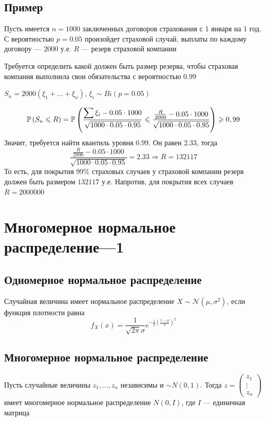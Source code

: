 \documentclass[a4paper, 10pt]{article}
\begin{document}
\subsection*{Пример}
Пусть имеется $n=1000$ заключенных договоров страхования с 1 января на 1 год. С вероятностью $p=0.05$ произойдет страховой случай, выплаты по каждому договору — 2000 у.е. $R$ — резерв страховой компании

Требуется определить какой должен быть размер резерва, чтобы страховая компания выполнила свои обязательства с вероятностью $0.99$

$S_n=2000(\xi_1+\ldots+\xi_n)$, $\xi_i\sim Bi(p=0.05)$

\begin{equation*}
    \prob{S_n\leqslant R}=\prob{\frac{\sum\xi_i-0.05\cdot1000}{\sqrt{1000\cdot0.05\cdot0.95}}\leqslant \frac{\frac{R}{2000}-0.05\cdot1000}{\sqrt{1000\cdot0.05\cdot0.95}}}\geqslant 0,99
\end{equation*}
Значит, требуется найти квантиль уровня $0.99$. Он равен $2.33$, тогда
\begin{equation*}
    \frac{\frac{R}{2000}-0.05\cdot1000}{\sqrt{1000\cdot0.05\cdot0.95}}=2.33\Longrightarrow R=132117
\end{equation*}
То есть, для покрытия 99\% страховых случаев у страховой компании резерв должен быть размером $132117$ у.е. Напротив, для покрытия всех случаев $R=2000000$




\newpage
\section{Многомерное нормальное распределение—1}
\subsection{Одномерное нормальное распределение}
 Случайная величина имеет нормальное распределение $X\sim\mathcal{N}(\mu,\sigma^2)$, если функция плотности равна
\begin{equation*}
    f_X(x)=\frac{1}{\sqrt{2\pi}\sigma}e^{-\frac{1}{2}\left(\frac{x-\mu}{\sigma}\right)^2}
\end{equation*}


\subsection{Многомерное нормальное распределение}
 Пусть случайные величины $z_1,\ldots,z_n$ независимы и $\sim N(0,1)$. Тогда $z=\begin{pmatrix}
    z_1\\
    \vdots\\
    z_n
\end{pmatrix}$ имеет многомерное нормальное распределение $N(0,I)$, где $I$ — единичная матрица
\end{document}
